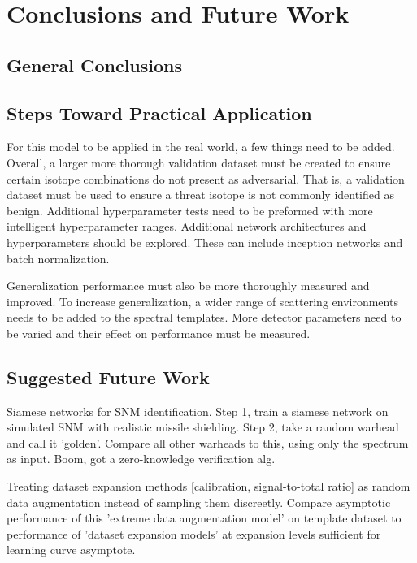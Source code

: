 \chapter{Conclusions and Future Work}

\section{General Conclusions}


\section{Steps Toward Practical Application}

For this model to be applied in the real world, a few things need to be added. Overall, a larger more thorough validation dataset must be created to ensure certain isotope combinations do not present as adversarial. That is, a validation dataset must be used to ensure a threat isotope is not commonly identified as benign. Additional hyperparameter tests need to be preformed with more intelligent hyperparameter ranges. Additional network architectures and hyperparameters should be explored. These can include inception networks and batch normalization.

Generalization performance must also be more thoroughly measured and improved. To increase generalization, a wider range of scattering environments needs to be added to the spectral templates. More detector parameters need to be varied and their effect on performance must be measured. 



\section{Suggested Future Work}

Siamese networks for SNM identification. Step 1, train a siamese network on simulated SNM with realistic missile shielding. Step 2, take a random warhead and call it 'golden'. Compare all other warheads to this, using only the spectrum as input. Boom, got a zero-knowledge verification alg.

Treating dataset expansion methods [calibration, signal-to-total ratio] as random data augmentation instead of sampling them discreetly. Compare asymptotic performance of this 'extreme data augmentation model' on template dataset to performance of 'dataset expansion models' at expansion levels sufficient for learning curve asymptote. 

